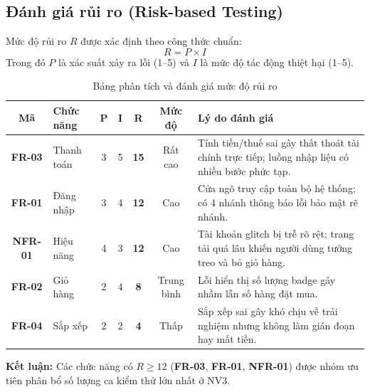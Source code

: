 \documentclass[a4paper]{article}
\begin{document}
\subsection{Đánh giá rủi ro (Risk-based Testing)}
Mức độ rủi ro $R$ được xác định theo công thức chuẩn:
\begin{equation}
  R = P \times I
\end{equation}
Trong đó $P$ là xác suất xảy ra lỗi (1--5) và $I$ là mức độ tác động thiệt hại (1--5).
\begin{table}[H]
\centering
\small
\begin{tabularx}{\textwidth}{|c|l|c|c|c|c|X|}
\hline
\textbf{Mã} & \textbf{Chức năng} & \textbf{P} & \textbf{I} & \textbf{R} & \textbf{Mức độ} & \textbf{Lý do đánh giá} \\ \hline
\textbf{FR-03} & Thanh toán & 3 & 5 & \textbf{15} & Rất cao & Tính tiền/thuế sai gây thất thoát tài chính trực tiếp; luồng nhập liệu có nhiều bước phức tạp. \\ \hline
\textbf{FR-01} & Đăng nhập & 3 & 4 & \textbf{12} & Cao & Cửa ngõ truy cập toàn bộ hệ thống; có 4 nhánh thông báo lỗi bảo mật rẽ nhánh. \\ \hline
\textbf{NFR-01} & Hiệu năng & 4 & 3 & \textbf{12} & Cao & Tài khoản glitch bị trễ rõ rệt; trang tải quá lâu khiến người dùng tưởng treo và bỏ giỏ hàng. \\ \hline
\textbf{FR-02} & Giỏ hàng & 2 & 4 & \textbf{8} & Trung bình & Lỗi hiển thị số lượng badge gây nhầm lẫn số hàng đặt mua. \\ \hline
\textbf{FR-04} & Sắp xếp & 2 & 2 & \textbf{4} & Thấp & Sắp xếp sai gây khó chịu về trải nghiệm nhưng không làm gián đoạn hay mất tiền. \\ \hline
\end{tabularx}
\caption{Bảng phân tích và đánh giá mức độ rủi ro}
\end{table}

\noindent \textbf{Kết luận:} Các chức năng có $R \ge 12$ (\textbf{FR-03}, \textbf{FR-01}, \textbf{NFR-01}) được nhóm ưu tiên phân bổ số lượng ca kiểm thử lớn nhất ở NV3.
\end{document}
